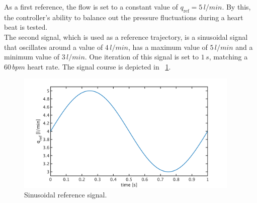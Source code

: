As a first reference, the flow is set to a constant value of $q_{\mathrm{ref}}=5\,l/min$. By this, the controller's ability to balance out the pressure fluctuations during a heart beat is tested.
\\The second signal, which is used as a reference trajectory, is a sinusoidal signal that oscillates around a value of $4\, l/min$, has a maximum value of $5\, l/min$ and a minimum value of $3\, l/min$. One iteration of this signal is set to $1\,s$, matching a $60\,bpm$ heart rate. The signal course is depicted in \figurename~\ref{fig:ref_sine}.
\begin{figure}[!ht]
  \centering
  \includegraphics[width=0.95\textwidth]{images/chapt_5/ILC/ref_sine.pdf}
  \caption[Sinusoidal reference signal]{Sinusoidal reference signal.}
  \label{fig:ref_sine}
\end{figure}

